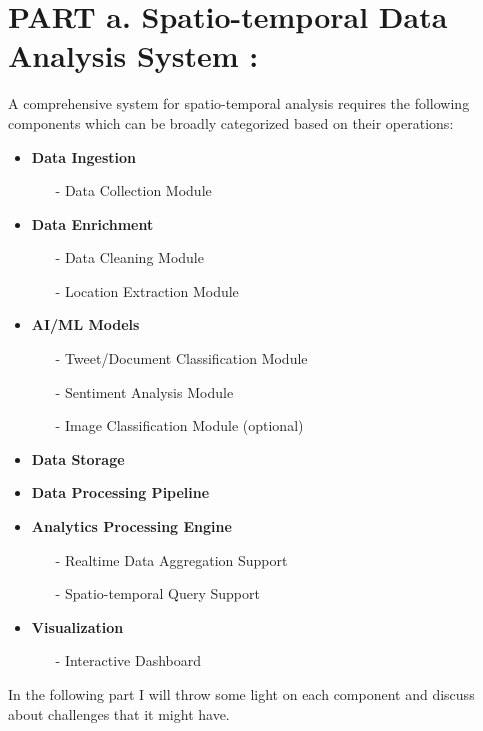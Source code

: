 \section{ PART a. Spatio-temporal Data Analysis System :}
\label{part_a}
A comprehensive system for spatio-temporal analysis requires the following components which can be broadly categorized based on their operations:

\begin{itemize}
  \item \textbf{Data Ingestion}
    {\em
    \begin{itemize}
      \item[-] Data Collection Module
    \end{itemize}
    }
  \item \textbf{Data Enrichment}
    {\em
    \begin{itemize}
    \item[-] Data Cleaning Module
    \item[-] Location Extraction Module
    \end{itemize}
    }
  \item \textbf{AI/ML Models}
    {\em
    \begin{itemize}
      \item[-] Tweet/Document Classification Module
      \item[-] Sentiment Analysis Module
      \item[-] Image Classification Module (optional)
    \end{itemize}
    }
  \item \textbf{Data Storage}
  \item \textbf{Data Processing Pipeline}
  \item \textbf{Analytics Processing Engine}
    {\em
    \begin{itemize}
      \item[-] Realtime Data Aggregation Support
      \item[-] Spatio-temporal Query Support
    \end{itemize}
    }
  \item \textbf{Visualization}
    {\em
    \begin{itemize}
      \item[-] Interactive Dashboard
    \end{itemize}
    }
\end{itemize}

In the following part I will throw some light on each component and discuss about challenges that it might have.

